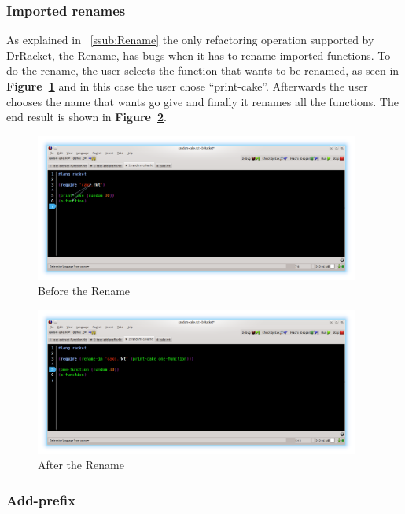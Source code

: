 \subsubsection{Imported renames}
As explained in ~\ref{ssub:Rename} the only refactoring operation supported by DrRacket, the Rename, has bugs when it has to rename imported functions.
To do the rename, the user selects the function that wants to be renamed, as seen in {\bf Figure~\ref{fig:renameBefore}} and in this case the user chose ``print-cake''.
Afterwards the user chooses the name that wants go give and finally it renames all the functions. 
The end result is shown in {\bf Figure~\ref{fig:renameAfter}}.
\begin{figure}[htbp]
	\centering
	\includegraphics[width=0.95\textwidth]{img/rename1.png}
	\caption{Before the Rename}
	\label{fig:renameBefore}
\end{figure}

\begin{figure}[htbp]
	\centering
	\includegraphics[width=0.95\textwidth]{img/rename2.png}
	\caption{After the Rename}
	\label{fig:renameAfter}
\end{figure}

\subsubsection{Add-prefix}

